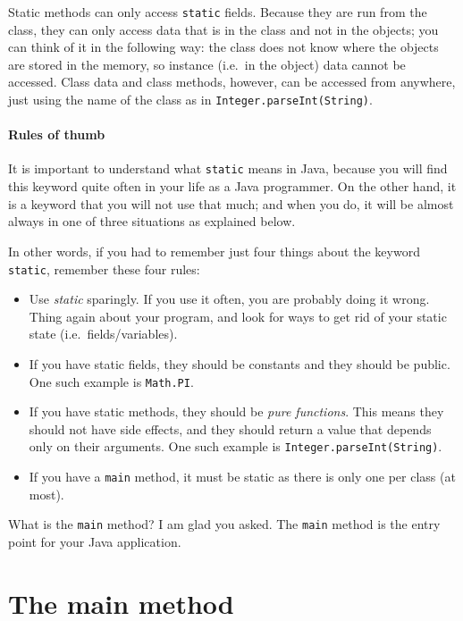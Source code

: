 Static methods can only access \verb+static+ fields. Because they are
run from the class, they can only access data that is in the class and
not in the objects; you can think of it in the following way: the
class does not know where the objects are stored in the memory, so
instance (i.e.~in the object) data cannot be accessed. Class data and
class methods, however, can be accessed from anywhere, just using the
name of the class as in \verb+Integer.parseInt(String)+. 

\paragraph{Rules of thumb}
\label{sec:rules-thumb-use}

It is important to understand what \verb+static+ means in Java,
because you will find this keyword quite often in your life as a Java
programmer. On the other hand, it is a keyword that you will not use
that much; and when you do, it will be almost always in one of three
situations as explained below. 

In other words, if you had to remember just four things about the keyword
\verb+static+, remember these four rules: 

\begin{itemize}
\item Use \emph{static} sparingly. If you use it often, you are
  probably doing it wrong. Thing again about your program, and look
  for ways to get rid of your static state (i.e.~fields/variables).
\item If you have static fields, they should be constants and they
  should be public. One such example is \verb+Math.PI+.
\item If you have static methods, they should be \emph{pure functions}. This
  means they should not have side effects, and they should return a
  value that depends only on their arguments. One such example is
  \verb+Integer.parseInt(String)+.
\item If you have a \verb+main+ method, it must be static as there is
  only one per class (at most). 
\end{itemize}

What is the \verb+main+ method? I am glad you asked. The \verb+main+
method is the entry point for your Java application. 

\section{The main method}
\label{sec:main-method}


